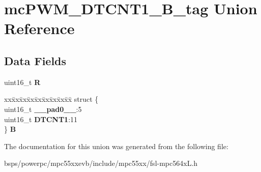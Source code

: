 \hypertarget{unionmcPWM__DTCNT1__16B__tag}{}\section{mc\+P\+W\+M\+\_\+\+D\+T\+C\+N\+T1\+\_\+B\+\_\+tag Union Reference}
\label{unionmcPWM__DTCNT1__16B__tag}
\subsection*{Data Fields}
\begin{DoxyCompactItemize}
\item 
\mbox{\label{unionmcPWM__DTCNT1__16B__tag_addb9b91be196dd58e676b958eec3fdf7}} 
uint16\+\_\+t {\bfseries R}
\item 
\mbox{\label{unionmcPWM__DTCNT1__16B__tag_a5512953e5e06deeb88ca2683208ca080}} 
\begin{tabbing}
xx\=xx\=xx\=xx\=xx\=xx\=xx\=xx\=xx\=\kill
struct \{\\
\>uint16\_t {\bfseries \_\_pad0\_\_}:5\\
\>uint16\_t {\bfseries DTCNT1}:11\\
\} {\bfseries B}\\

\end{tabbing}\end{DoxyCompactItemize}


The documentation for this union was generated from the following file\+:\begin{DoxyCompactItemize}
\item 
bsps/powerpc/mpc55xxevb/include/mpc55xx/fsl-\/mpc564x\+L.\+h\end{DoxyCompactItemize}
